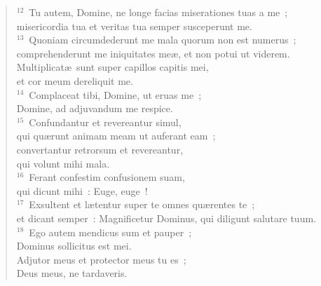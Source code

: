\begin{flushleft}
\begin{verse}
${}^{12}$~Tu autem, Domine, ne longe facias miserationes tuas a me~;\\ misericordia tua et veritas tua semper susceperunt me.\\
${}^{13}$~Quoniam circumdederunt me mala quorum non est numerus~;\\ comprehenderunt me iniquitates me\ae , et non potui ut viderem.\\ Multiplicat\ae\ sunt super capillos capitis mei,\\ et cor meum dereliquit me.\\
${}^{14}$~Complaceat tibi, Domine, ut eruas me~;\\ Domine, ad adjuvandum me respice.\\
${}^{15}$~Confundantur et revereantur simul,\\ qui qu\ae runt animam meam ut auferant eam~;\\ convertantur retrorsum et revereantur,\\ qui volunt mihi mala.\\
${}^{16}$~Ferant confestim confusionem suam,\\ qui dicunt mihi~: Euge, euge~!\\
${}^{17}$~Exsultent et l\ae tentur super te omnes qu\ae rentes te~;\\ et dicant semper~: Magnificetur Dominus, qui diligunt salutare tuum.\\
${}^{18}$~Ego autem mendicus sum et pauper~;\\ Dominus sollicitus est mei.\\ Adjutor meus et protector meus tu es~;\\ Deus meus, ne tardaveris.\end{verse}\end{flushleft}


